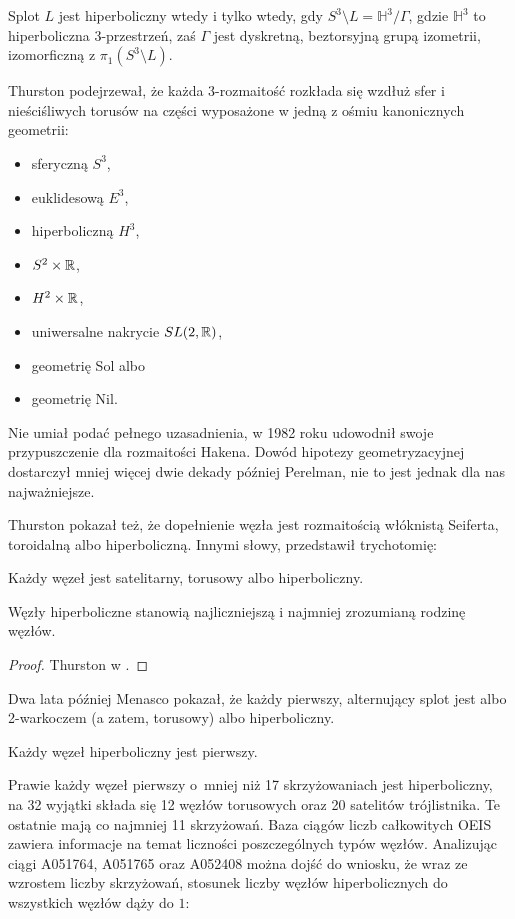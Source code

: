 \begin{proposition}
    Splot $L$ jest hiperboliczny wtedy i tylko wtedy, gdy $S^3 \setminus L = \mathbb H^3 / \Gamma$, gdzie $\mathbb H^3$ to hiperboliczna 3-przestrzeń, zaś $\Gamma$ jest dyskretną, beztorsyjną grupą izometrii, izomorficzną z $\pi_1(S^3 \setminus L)$.
\end{proposition}

Thurston podejrzewał, że każda 3-rozmaitość rozkłada się wzdłuż sfer i nieściśliwych torusów na części wyposażone w jedną z ośmiu kanonicznych geometrii:
\begin{itemize}
\item sferyczną $S^3$,
\item euklidesową $E^3$,
\item hiperboliczną $H^3$,
\item $S^2 \times \mathbb R$,
\item $H^2 \times \mathbb R$,
\item uniwersalne nakrycie $SL(2, \mathbb R)$,
\item geometrię Sol albo
\item geometrię Nil.
\end{itemize}
Nie umiał podać pełnego uzasadnienia, w 1982 roku udowodnił swoje przypuszczenie dla rozmaitości Hakena.
Dowód hipotezy geometryzacyjnej dostarczył mniej więcej dwie dekady później Perelman, nie to jest jednak dla nas najważniejsze.

Thurston pokazał też, że dopełnienie węzła jest rozmaitością włóknistą Seiferta, toroidalną albo hiperboliczną.
Innymi słowy, przedstawił trychotomię:
\begin{theorem}
    Każdy węzeł jest satelitarny, torusowy albo hiperboliczny.
\end{theorem}

Węzły hiperboliczne stanowią najliczniejszą i najmniej zrozumianą rodzinę węzłów.

\begin{proof}
    Thurston w \cite{thurston82}.
\end{proof}

Dwa lata później Menasco \cite{menasco84} pokazał, że każdy pierwszy, alternujący splot jest albo 2-warkoczem (a zatem, torusowy) albo hiperboliczny.

\begin{corollary}
    Każdy węzeł hiperboliczny jest pierwszy.
\end{corollary}

Prawie każdy węzeł pierwszy o~mniej niż 17 skrzyżowaniach jest hiperboliczny, na 32 wyjątki składa się 12 węzłów torusowych oraz 20 satelitów trójlistnika.
Te ostatnie mają co najmniej 11 skrzyżowań.
Baza ciągów liczb całkowitych OEIS zawiera informacje na temat liczności poszczególnych typów węzłów.
Analizując ciągi A051764, A051765 oraz A052408 można dojść do wniosku, że wraz ze wzrostem liczby skrzyżowań, stosunek liczby węzłów hiperbolicznych do wszystkich węzłów dąży do $1$:

